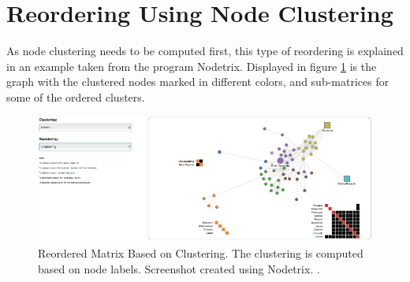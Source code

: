 \section{Reordering Using Node Clustering}
As node clustering needs to be computed first, this type of reordering is explained in an example taken from the program Nodetrix. Displayed in figure \ref{fig:reordering_nodetrix_cluster} is the graph with the clustered nodes marked in different colors, and sub-matrices for some of the ordered clusters.

\begin{figure}[H]
  \centering
  \includegraphics[scale=0.9]{images/Reordering_NodeTrix_cluster.png}
  \caption{Reordered Matrix Based on Clustering. The clustering is computed based on node labels. Screenshot created using Nodetrix. \citep[1302-1309]{henry-nodetrix-2007}. \label{fig:reordering_nodetrix_cluster}}
\end{figure}
